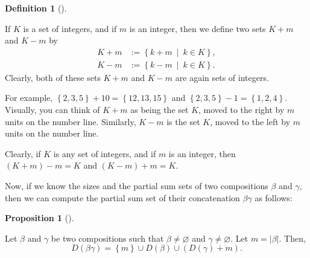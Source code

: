 \documentclass[numbers=enddot,12pt,final,onecolumn,notitlepage]{scrartcl}%
\theoremstyle{definition}
\newtheorem{prop}[theo]{Proposition}
\newenvironment{proposition}[1][]
{\begin{prop}[#1]\begin{leftbar}}
{\end{leftbar}\end{prop}}
\newtheorem{defi}[theo]{Definition}
\newenvironment{definition}[1][]
{\begin{defi}[#1]\begin{leftbar}}
{\end{leftbar}\end{defi}}
\begin{document}
\begin{definition}
\label{def.K+m}If $K$ is a set of integers, and if $m$ is an integer, then we
define two sets $K+m$ and $K-m$ by%
\begin{align*}
K+m  &  :=\left\{  k+m\ \mid\ k\in K\right\}  ,\\
K-m  &  :=\left\{  k-m\ \mid\ k\in K\right\}  .
\end{align*}
Clearly, both of these sets $K+m$ and $K-m$ are again sets of integers.
\end{definition}

For example, $\left\{  2,3,5\right\}  +10=\left\{  12,13,15\right\}  $ and
$\left\{  2,3,5\right\}  -1=\left\{  1,2,4\right\}  $. Visually, you can think
of $K+m$ as being the set $K$, moved to the right by $m$ units on the number
line. Similarly, $K-m$ is the set $K$, moved to the left by $m$ units on the
number line.

Clearly, if $K$ is any set of integers, and if $m$ is an integer, then
$\left(  K+m\right)  -m=K$ and $\left(  K-m\right)  +m=K$.

Now, if we know the sizes and the partial sum sets of two compositions $\beta$
and $\gamma$, then we can compute the partial sum set of their concatenation
$\beta\gamma$ as follows:

\begin{proposition}
\label{prop.concat.D}Let $\beta$ and $\gamma$ be two compositions such that
$\beta\neq\varnothing$ and $\gamma\neq\varnothing$. Let $m=\left\vert
\beta\right\vert $. Then,
\[
D\left(  \beta\gamma\right)  =\left\{  m\right\}  \cup D\left(  \beta\right)
\cup\left(  D\left(  \gamma\right)  +m\right)  .
\]

\end{proposition}
\end{document}
